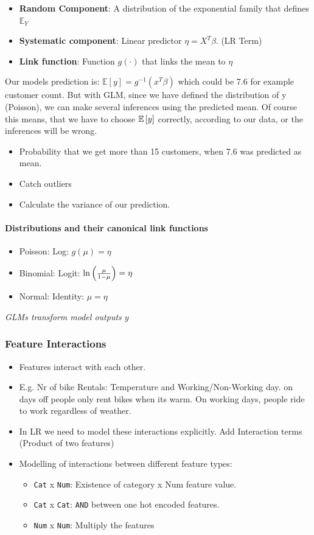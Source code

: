 \begin{itemize}
	\item \textbf{Random Component}: A distribution of the exponential family that defines $\mathbb{E}_Y$
	\item \textbf{Systematic component}: Linear predictor $\eta = X^T\beta$. (LR Term)
	\item \textbf{Link function}: Function $g(\cdot)$ that links the mean to $\eta$
\end{itemize}

Our models prediction is: $\mathbb{E}[y] = g^{-1}(x^T\beta)$ which could be 7.6 for example customer count.
But with GLM, since we have defined the distribution of y (Poisson), we can make several inferences using the predicted mean.
Of course this means, that we have to choose $\mathbb{E}\left[ y \right]$ correctly, according to our data, or the inferences will be wrong.
\begin{itemize}
	\item Probability that we get more than 15 customers, when 7.6 was predicted as mean.
	\item Catch outliers
	\item Calculate the variance of our prediction.
\end{itemize}
\paragraph{Distributions and their canonical link functions}
\begin{itemize}
	\item Poisson: Log: $g(\mu) = \eta$
	\item Binomial: Logit: $\ln\left (\frac{\mu}{1-\mu}\right)=\eta$
	\item Normal: Identity: $\mu=\eta$
\end{itemize}

\textit{GLMs transform model outputs $y$}

\subsubsection{Feature Interactions}
\begin{itemize}
	\item Features interact with each other.
	\item E.g. Nr of bike Rentals: Temperature and Working/Non-Working day. on days off people only rent bikes when its warm. On working days, people ride to work regardless of weather.
	\item In LR we need to model these interactions explicitly. Add Interaction terms (Product of two features)
	\item Modelling of interactions between different feature types:
	      \begin{itemize}
		      \item \texttt{Cat} x \texttt{Num}: Existence of category x Num feature value.
		      \item \texttt{Cat} x \texttt{Cat}: \texttt{AND} between one hot encoded features.
		      \item \texttt{Num} x \texttt{Num}: Multiply the features
	      \end{itemize}
\end{itemize}


